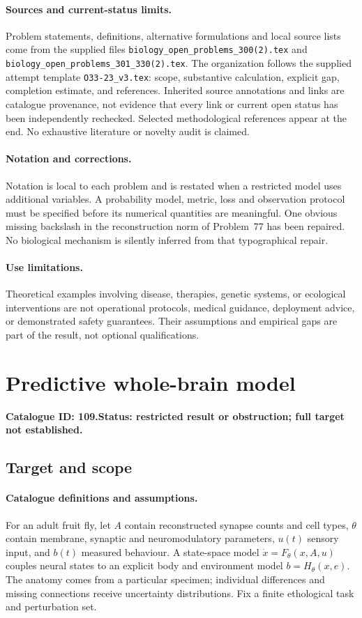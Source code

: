 \documentclass[11pt]{article}
\begin{document}
\paragraph{Sources and current-status limits.}
Problem statements, definitions, alternative formulations and local source lists
come from the supplied files
\texttt{biology\_open\_problems\_300(2).tex} and
\texttt{biology\_open\_problems\_301\_330(2).tex}.
The organization follows the supplied attempt template
\texttt{O33-23\_v3.tex}: scope, substantive calculation, explicit gap,
completion estimate, and references. Inherited source annotations and links are
catalogue provenance, not evidence that every link or current open status has
been independently rechecked. Selected methodological references appear at the
end. No exhaustive literature or novelty audit is claimed.

\paragraph{Notation and corrections.}
Notation is local to each problem and is restated when a restricted model uses
additional variables. A probability model, metric, loss and observation protocol
must be specified before its numerical quantities are meaningful. One obvious
missing backslash in the reconstruction norm of Problem~77 has been repaired.
No biological mechanism is silently inferred from that typographical repair.

\paragraph{Use limitations.}
Theoretical examples involving disease, therapies, genetic systems, or ecological
interventions are not operational protocols, medical guidance, deployment advice,
or demonstrated safety guarantees. Their assumptions and empirical gaps are part
of the result, not optional qualifications.

\setcounter{section}{108}
\section{Predictive whole-brain model}
\label{prob:109}
\noindent\textbf{Catalogue ID: 109.}\quad \textbf{Status: restricted result or obstruction; full target not established.}
\subsection{Target and scope}
\paragraph{Catalogue definitions and assumptions.}
For an adult fruit fly, let $A$ contain reconstructed synapse counts and cell types, $\theta$ contain membrane, synaptic and neuromodulatory parameters, $u(t)$ sensory input, and $b(t)$ measured behaviour. A state-space model $\dot x=F_\theta(x,A,u)$ couples neural states to an explicit body and environment model $b=H_\theta(x,e)$. The anatomy comes from a particular specimen; individual differences and missing connections receive uncertainty distributions. Fix a finite ethological task and perturbation set.
\end{document}
